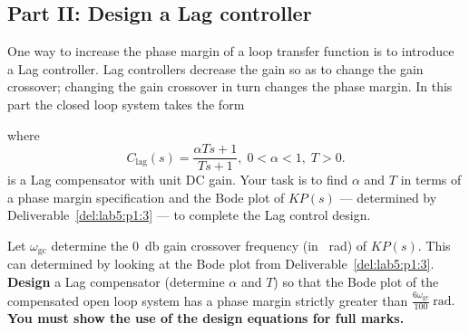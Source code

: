 \subsection{Part II: Design a Lag controller}
One way to increase the phase margin of a loop transfer function is to introduce a Lag controller.
Lag controllers decrease the gain so as to change the gain crossover;
changing the gain crossover in turn changes the phase margin.
In this part the closed loop system takes the form
%
\begin{center}
\end{center}
%
where
\[
  C_\mathrm{lag}(s)
    =
      \frac{\alpha T s + 1}{T s + 1}
  ,
  \;
  0 < \alpha < 1
  ,
  \;
  T > 0.
\]
is a Lag compensator with unit DC gain.
Your task is to find \(\alpha\) and \(T\) in terms of a phase margin specification and the Bode plot of \(K P(s)\) --- determined by Deliverable~\ref{del:lab5:p1:3} --- to complete the Lag control design.
%
\begin{deliverable}[label={del:lab5:p2:1}]
  Let \(\omega_\mathrm{gc}\) determine the \SI{0}{\decibel} gain crossover frequency (in \SI{}{\radian}) of \(K P(s).\) 
  This can determined by looking at the Bode plot from Deliverable~\ref{del:lab5:p1:3}.
  \textbf{Design} a Lag compensator (determine \(\alpha\) and \(T\)) so that the Bode plot of the compensated open loop system has a phase margin strictly greater than \(\frac{6\omega_\mathrm{gc}}{100}~\mathrm{rad}.\)
  \textbf{You must show the use of the design equations for full marks.}
\end{deliverable}
